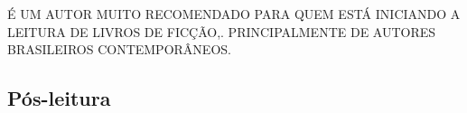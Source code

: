 \documentclass[12pt]{extarticle}
\begin{document}
É UM AUTOR MUITO RECOMENDADO PARA QUEM ESTÁ INICIANDO A LEITURA DE LIVROS DE
  FICÇÃO,. PRINCIPALMENTE DE AUTORES BRASILEIROS CONTEMPORÂNEOS.

\subsection{Pós-leitura}







\end{document}
